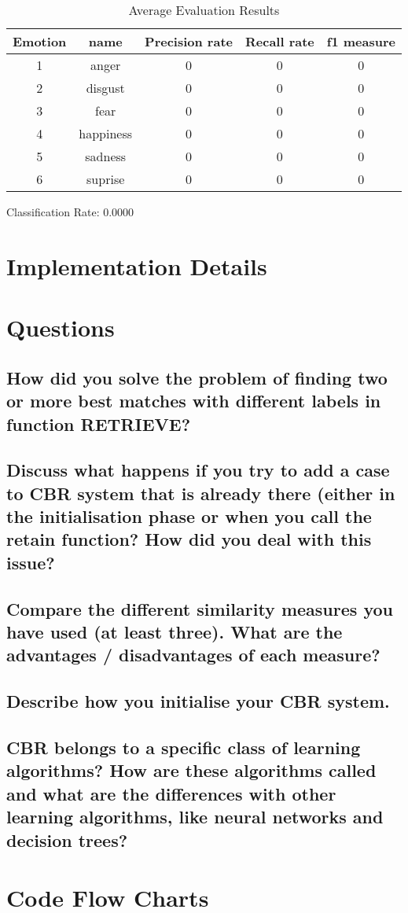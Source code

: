 \documentclass[11pt]{article}
\begin{document}
\begin{table}[H]
\caption{Average Evaluation Results} %
\centering %
\begin{tabular}{c c c c c} %
\hline\hline %
Emotion & name & Precision rate & Recall rate & f1 measure\\ [0.5ex] %
\hline %
1 & anger     & 0 & 0 & 0\\ %
2 & disgust   & 0 & 0 & 0\\
3 & fear      & 0 & 0 & 0\\
4 & happiness & 0 & 0 & 0\\
5 & sadness   & 0 & 0 & 0\\ 
6 & suprise   & 0 & 0 & 0\\ [1ex] %
\hline %
\end{tabular}
\label{table:sixevaluation} %
\end{table}

Classification Rate: 0.0000


\section{Implementation Details}
\section{Questions}

\subsection{How did you solve the problem of finding two or more best matches with different labels in function RETRIEVE?}

\subsection{Discuss what happens if you try to add a case to CBR system that is already there (either in the initialisation phase or when you call the retain function? How did you deal with this issue?}

\subsection{Compare the different similarity measures you have used (at least three). What are the advantages / disadvantages of each measure?}

\subsection{Describe how you initialise your CBR system.}

\subsection{CBR belongs to a specific class of learning algorithms? How are these algorithms called and what are the differences with other learning algorithms, like neural networks and decision trees?}


\section{Code Flow Charts}
\end{document}
